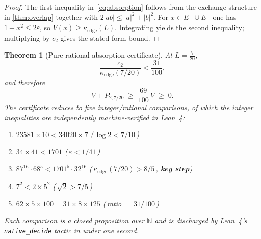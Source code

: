 \documentclass[12pt,a4paper]{amsart}
\theoremstyle{plain}
\newtheorem{theorem}{Theorem}[section]
\theoremstyle{definition}
\newcommand{\ctwo}{c_2}              %
\newcommand{\kappae}{\kappa_{\mathrm{edge}}}
\newcommand{\Eminus}{E_-}
\newcommand{\Eplus}{E_+}
\begin{document}
\begin{proof}
The first inequality in~\eqref{eq:absorption} follows from the exchange
structure in \cref{thm:overlap} together with $2|ab| \le |a|^2 + |b|^2$.
For $x \in \Eminus \cup \Eplus$ one has $1 - x^2 \le 2\varepsilon$, so
$V(x) \ge \kappae(L)$.
Integrating yields the second inequality; multiplying by $\ctwo$ gives the
stated form bound.
\end{proof}

\begin{theorem}[Pure-rational absorption certificate]
\label{thm:rational-cert}
At $L = \tfrac{7}{20}$,
\[
  \frac{\ctwo}{\kappae(7/20)} < \frac{31}{100},
\]
and therefore
\[
  \boxed{V + P_{2,7/20} \;\ge\; \frac{69}{100}\,V \;\ge\; 0.}
\]
The certificate reduces to five integer/rational comparisons, of which
the integer inequalities are independently machine-verified in Lean~4:
\begin{enumerate}
\item $23581 \times 10 < 34020 \times 7$
      \hfill(\,$\log 2 < 7/10$\,)
\item $34 \times 41 < 1701$
      \hfill(\,$\varepsilon < 1/41$\,)
\item $87^{16} \cdot 68^{5} < 1701^{5} \cdot 32^{16}$
      \hfill(\,$\kappae(7/20) > 8/5$\,, \textbf{key step})
\item $7^2 < 2 \times 5^2$
      \hfill(\,$\sqrt{2} > 7/5$\,)
\item $62 \times 5 \times 100 = 31 \times 8 \times 125$
      \hfill(\,ratio $= 31/100$\,)
\end{enumerate}
Each comparison is a closed proposition over $\mathbb{N}$ and is
discharged by Lean~4's \texttt{native\_decide} tactic in under one second.
\end{theorem}
\end{document}
